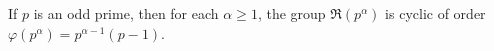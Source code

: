 If $p$ is an odd prime, then for each $\alpha \geq 1$, the group $\Re(p^\alpha)$ is cyclic of order $\varphi(p^\alpha) = p^{\alpha-1}(p-1)$.
